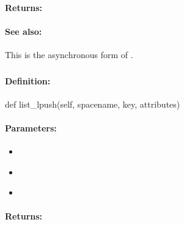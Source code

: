 \paragraph{Returns:}


\paragraph{See also:}  This is the asynchronous form of .

\pagebreak
\subsubsection{}
\label{api:python:list_lpush}


\paragraph{Definition:}
\begin{pythoncode}
def list_lpush(self, spacename, key, attributes)
\end{pythoncode}

\paragraph{Parameters:}
\begin{itemize}[noitemsep]
\item {}\\

\item {}\\

\item {}\\

\end{itemize}

\paragraph{Returns:}


\pagebreak
\subsubsection{}
\label{api:python:async_list_lpush}


